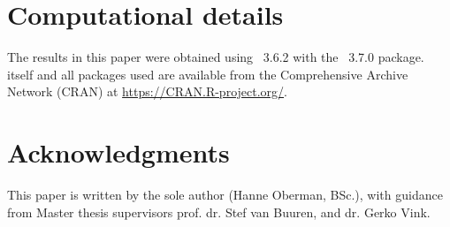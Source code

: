 \documentclass[article]{jss}
\begin{document}

% 




\section*{Computational details}


The results in this paper were obtained using ~3.6.2 with the ~3.7.0 package.  itself and all packages used are available from the Comprehensive  Archive Network (CRAN) at \url{https://CRAN.R-project.org/}.


\section*{Acknowledgments}


This paper is written by the sole author (Hanne Oberman, BSc.), with guidance from Master thesis supervisors prof. dr. Stef van Buuren, and dr. Gerko Vink.
\end{document}
